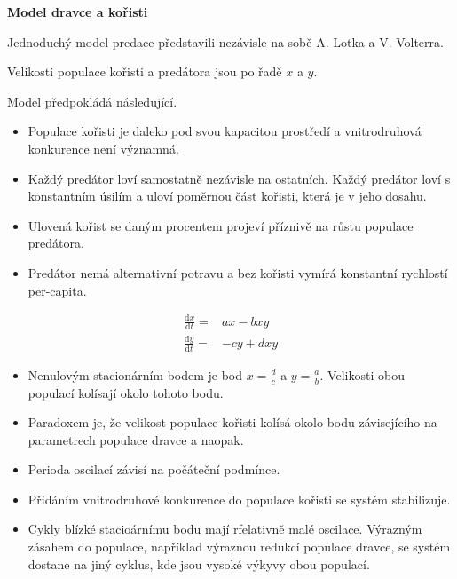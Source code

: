 \documentclass{article}
\begin{document}
\begin{center}
  \Large \bfseries
Model dravce a kořisti
\end{center}
\pagestyle{empty}


Jednoduchý model predace představili nezávisle na sobě A. Lotka a
V. Volterra.

Velikosti populace kořisti a predátora jsou po řadě $x$ a $y$.

Model předpokládá následující.

\begin{itemize}
\item Populace kořisti je daleko pod svou kapacitou prostředí a
  vnitrodruhová konkurence není významná.
\item Každý predátor loví samostatně nezávisle na ostatních. Každý
  predátor loví s konstantním úsilím a uloví poměrnou část kořisti, která je v jeho dosahu.
\item Ulovená kořist se daným procentem projeví příznivě na růstu populace predátora. 
\item Predátor nemá alternativní potravu a bez kořisti vymírá konstantní rychlostí per-capita.
\end{itemize}

\begin{equation*}
\begin{aligned}
\frac{\mathrm dx}{\mathrm dt}={}&ax-bxy\\
\frac{\mathrm dy}{\mathrm dt}={}&-cy+dxy
\end{aligned}
\end{equation*}

\begin{itemize}
\item Nenulovým stacionárním bodem je bod $x=\frac dc$ a $y=\frac
ab$. Velikosti obou populací kolísají okolo tohoto bodu. 
\item Paradoxem je, že velikost populace kořisti kolísá okolo bodu závisejícího na parametrech populace dravce a naopak. 
\item Perioda oscilací závisí na počáteční podmínce.  
\item Přidáním vnitrodruhové konkurence do populace kořisti se systém stabilizuje. 
\item Cykly blízké stacioárnímu bodu mají rfelativně malé oscilace. Výrazným zásahem do populace, například výraznou redukcí populace dravce, se systém dostane na jiný cyklus, kde jsou vysoké výkyvy obou populací. 
  
\end{itemize}
\end{document}
